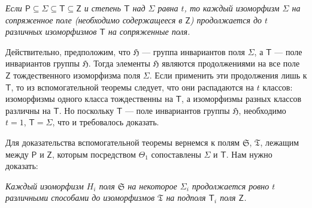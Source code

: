 \documentclass[11pt]{article}
\begin{document}
\emph{Если \(\mathsf P \subseteq \Sigma \subseteq \mathsf T \subseteq \mathsf Z\) и степень \(\mathsf T\) над \(\Sigma\) равна \(t\), то каждый изоморфизм \(\Sigma\) на сопряженное поле (необходимо содержащееся в \(\mathsf Z\)) продолжается до \(t\) различных изоморфизмов \(\mathsf T\) на сопряженные поля.}

Действительно, предположим, что \(\mathfrak H\) --- группа инвариантов поля \(\Sigma\), а \(\mathsf T\) --- поле инвариантов группы \(\mathfrak H\). Тогда элементы \(\mathfrak H\) являются продолжениями на все поле \(\mathsf Z\) тождественного изоморфизма поля \(\Sigma\). Если применить эти продолжения лишь к \(\mathsf T\), то из вспомогательной теоремы следует, что они распадаются на \(t\) классов: изоморфизмы одного класса тождественны на \(\mathsf T\), а изоморфизмы разных классов различны на \(\mathsf T\). Но поскольку \(\mathsf T\) --- поле инвариантов группы \(\mathfrak H\), необходимо \(t=1\), \(\mathsf T=\Sigma\), что и требовалось доказать.

Для доказательства вспомогательной теоремы вернемся к полям \(\mathfrak S\), \(\mathfrak T\), лежащим между \(\mathsf P\) и \(\mathsf Z\), которым посредством \(\Theta_1\) сопоставлены \(\Sigma\) и \(\mathsf T\). Нам нужно доказать:

\emph{Каждый изоморфизм \(H_i\) поля \(\mathfrak S\) на некоторое \(\Sigma_i\) продолжается ровно \(t\) различными способами до изоморфизмов \(\mathfrak T\) на подполя \(\mathsf T_i\) поля \(\mathsf Z\).}
\end{document}
